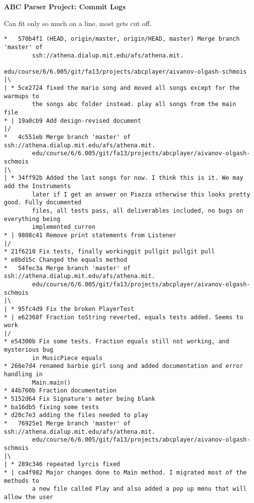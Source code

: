 \documentclass[12pt]{book}
\begin{document}
\phantom{xxx}
\bigskip
\centerline{{\large \bf ABC Parser Project: Commit Logs }}
\bigskip\bigskip

Can fit only so much on a line, most gets cut off.

\begin{Verbatim}
*   570b4f1 (HEAD, origin/master, origin/HEAD, master) Merge branch 'master' of 
        ssh://athena.dialup.mit.edu/afs/athena.mit.
                edu/course/6/6.005/git/fa13/projects/abcplayer/aivanov-olgash-schmois
|\
| * 5ce2724 fixed the mario song and moved all songs except for the warmups to 
        the songs abc folder instead. play all songs from the main file
* | 19a0cb9 Add design-revised document
|/
*   4c551eb Merge branch 'master' of ssh://athena.dialup.mit.edu/afs/athena.mit.
        edu/course/6/6.005/git/fa13/projects/abcplayer/aivanov-olgash-schmois
|\
| * 34ff92b Added the last songs for now. I think this is it. We may add the Instruments 
        later if I get an answer on Piazza otherwise this looks pretty good. Fully documented 
        files, all tests pass, all deliverables included, no bugs on everything being 
        implemented curren
* | 9808c41 Remove print statements from Listener
|/
* 21f6210 Fix tests, finally workinggit pullgit pullgit pull
* e8bd15c Changed the equals method
*   54fec3a Merge branch 'master' of ssh://athena.dialup.mit.edu/afs/athena.mit.
        edu/course/6/6.005/git/fa13/projects/abcplayer/aivanov-olgash-schmois
|\
| * 95fc4d9 Fix the broken PlayerTest
* | e62368f Fraction toString reverted, equals tests added. Seems to work
|/
* e54300b Fix some tests. Fraction equals still not working, and mysterious bug 
        in MusicPiece equals
* 266e7d4 renamed barbie girl song and added documentation and error handling in 
        Main.main()
* 44b760b Fraction documentation
* 5152d64 Fix Signature's meter being blank
* ba16db5 fixing some tests
* d20c7e3 adding the files needed to play
*   76925e1 Merge branch 'master' of ssh://athena.dialup.mit.edu/afs/athena.mit.
        edu/course/6/6.005/git/fa13/projects/abcplayer/aivanov-olgash-schmois
|\
| * 289c346 repeated lyrcis fixed
* | ca4f982 Major changes done to Main method. I migrated most of the methods to 
        a new file called Play and also added a pop up menu that will allow the user 

\end{Verbatim}
\end{document}
